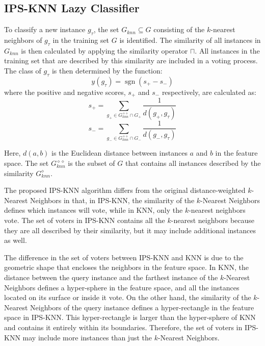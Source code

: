 \documentclass[
]{ceurart}
\begin{document}
\subsection{IPS-KNN Lazy Classifier}
To classify a new instance $g_{\tau}$, the set $G_{knn}\subseteq G$ consisting of the $k$-nearest neighbors of $g_{\tau}$ in the training set $G$ is identified. The similarity of all instances in $G_{knn}$ is then calculated by applying the similarity operator $\sqcap$. All instances in the training set that are described by this similarity are included in a voting process. The class of $g_{\tau}$ is then determined by the function:
\begin{equation}
    y(g_{\tau}) = \operatorname{sgn}(s_{+} - s_{-})
\end{equation}
where the positive and negative scores, $s_{+}$ and $s_{-}$ respectively, are calculated as:
\begin{equation}
    s_{+} = \sum_{g_{+} \in G_{knn}^{\diamond \diamond} \cap G_{+}} \frac{1}{d(g_{+}, g_{\tau})} \label{eq:s+}
\end{equation}
\begin{equation}
    s_{-} = \sum_{g_{-} \in G_{knn}^{\diamond \diamond} \cap G_{-}} \frac{1}{d(g_{-}, g_{\tau})} \label{eq:s-}
\end{equation}

Here, $d(a, b)$ is the Euclidean distance between instances $a$ and $b$ in the feature space. The set $G_{knn}^{\diamond \diamond}$ is the subset of $G$ that contains all instances described by the similarity $G_{knn}^{\diamond}$. 


The proposed IPS-KNN algorithm differs from the original distance-weighted $k$-Nearest Neighbors in that, in IPS-KNN, the similarity of the $k$-Nearest Neighbors defines which instances will vote, while in KNN, only the $k$-nearest neighbors vote. The set of voters in IPS-KNN contains all the $k$-nearest neighbors because they are all described by their similarity, but it may include additional instances as well. 

The difference in the set of voters between IPS-KNN and KNN is due to the geometric shape that encloses the neighbors in the feature space. In KNN, the distance between the query instance and the farthest instance of the $k$-Nearest Neighbors defines a hyper-sphere in the feature space, and all the instances located on its surface or inside it vote. On the other hand, the similarity of the $k$-Nearest Neighbors of the query instance defines a hyper-rectangle in the feature space in IPS-KNN. This hyper-rectangle is larger than the hyper-sphere of KNN and contains it entirely within its boundaries. Therefore, the set of voters in IPS-KNN may include more instances than just the $k$-Nearest Neighbors. 
\end{document}
